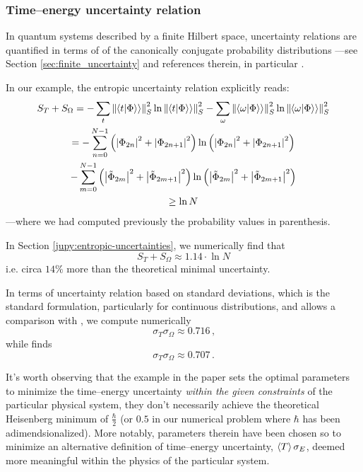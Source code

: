 \subsubsection{Time--energy uncertainty relation}

In quantum systems described by a finite Hilbert space,
uncertainty relations are quantified in terms of 
of the canonically conjugate probability distributions
---see Section \ref{sec:finite_uncertainty} and references therein,
in particular \cite{FiniteHilb}.

In our example, the entropic uncertainty relation explicitly reads:
\begin{multline}
 S_T + S_{\Omega} =
  -\sum_t \norm{\bradket{t}{\Phi}}_S^2 \ln \norm{\bradket{t}{\Phi}}_S^2
  -\sum_{\omega} \norm{\bradket{\omega}{\Phi}}_S^2 \ln \norm{\bradket{\omega}{\Phi}}_S^2 \\
%
  = -\sum_{n=0}^{N-1} \left(\abs{\Phi_{2n}}^2 + \abs{\Phi_{2n+1}}^2\right) \ln \left(\abs{\Phi_{2n}}^2 + \abs{\Phi_{2n+1}}^2\right) \\
    -\sum_{m=0}^{N-1}
          \left(\abs{\tilde{\Phi}_{2m}}^2 + \abs{\tilde{\Phi}_{2m+1}}^2\right)
      \ln \left(\abs{\tilde{\Phi}_{2m}}^2 + \abs{\tilde{\Phi}_{2m+1}}^2\right) \\
%
  \geq \ln N
\end{multline}
---where we had computed previously the probability values in parenthesis.

In Section \ref{jupy:entropic-uncertainties}, we numerically find that
\begin{equation*}
  S_{T} + S_{\Omega} \approx 1.14 \cdot \ln N
\end{equation*}
i.e. circa $14\%$ more than the theoretical minimal uncertainty.

In terms of uncertainty relation based on standard deviations,
which is the standard formulation, particularly for continuous distributions,
and allows a comparison with \cite{RuschhauptAbsorption}, we compute numerically
\begin{equation}\label{eq:uncertainty-us}
  \sigma_{T} \sigma_{\Omega} \approx 0.716 \, \text{,}
\end{equation} \citereset
while \cite{RuschhauptAbsorption} finds
\begin{equation}\label{eq:uncertainty-them}
  \sigma_{T} \sigma_{\Omega} \approx 0.707 \, \text{.}
\end{equation}

It's worth observing that the example in the paper
sets the optimal parameters to minimize the time--energy uncertainty
\emph{within the given constraints} of the particular physical system,
they don't necessarily achieve the theoretical Heisenberg minimum of
$\frac{\hbar}{2}$
(or $0.5$ in our numerical problem where $\hbar$ has been adimendsionalized).
More notably, parameters therein have been chosen so to minimize
an alternative definition of time--energy uncertainty, $\expval{T}\sigma_E$,
deemed more meaningful within the physics of the particular system.

